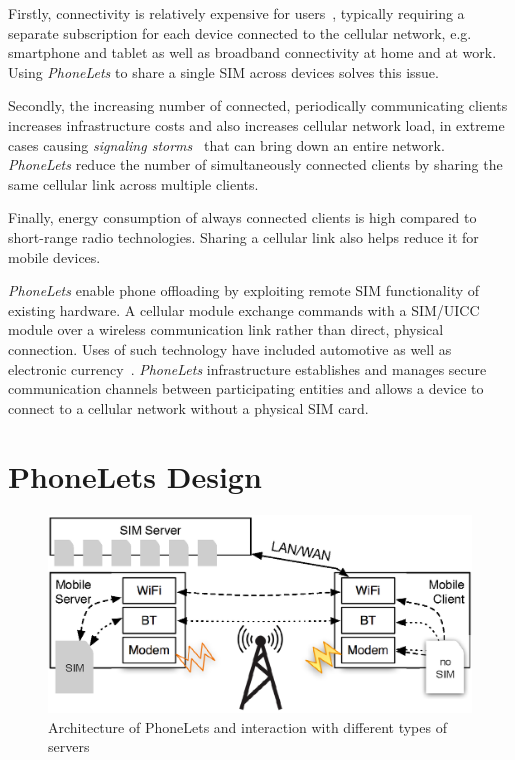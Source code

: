 \documentclass{sig-alternate-2013}
\begin{document}
Firstly, connectivity is relatively expensive for users~\cite{Anonymous:2013ut}, typically requiring a separate subscription for each device connected to the cellular network, e.g. smartphone and tablet as well as broadband connectivity at home and at work. Using \emph{PhoneLets} to share a single SIM across devices solves this issue.

Secondly, the increasing number of connected, periodically communicating clients increases infrastructure costs and also increases cellular network load, in extreme cases causing \emph{signaling storms}~\cite{Yang:wh} that can bring down an entire network. \emph{PhoneLets} reduce the number of simultaneously connected clients by sharing the same cellular link across multiple clients.

Finally, energy consumption of always connected clients is high compared to short-range radio technologies. Sharing a cellular link also helps reduce it for mobile devices.

\emph{PhoneLets} enable phone offloading by exploiting remote SIM functionality of existing hardware. A cellular module exchange commands with a SIM/UICC module over a wireless communication link rather than direct, physical connection. Uses of such technology have included automotive as well as electronic currency~\cite{subramanian2003sim}. \emph{PhoneLets} infrastructure establishes and manages secure communication channels between participating entities and allows a device to connect to a cellular network without a physical SIM card.


\section{PhoneLets Design}

\begin{figure}
\centering
\includegraphics[width=\columnwidth]{figs/arch}
\caption{Architecture of PhoneLets and interaction with different types of servers}
\label{fig:arch}
\end{figure}
\end{document}
